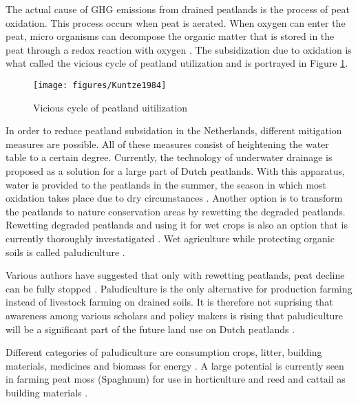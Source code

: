 \documentclass[a4paper,12pt]{scrbook}
\begin{document}
The actual cause of \ac{GHG} emissions from drained peatlands is the process of peat oxidation. This process occurs when peat is aerated. When oxygen can enter the peat, micro organisms can decompose the organic matter that is stored in the peat through a redox reaction with oxygen \citep{erkens2016double}. The subsidization due to oxidation is what \citet{kuntze1984bewirtschaftung} called the vicious cycle of peatland utilization and is portrayed in Figure \ref{fig:peatlanduti}.

\begin{figure}
    \centering
    \texttt{[image: figures/Kuntze1984]} 
    \caption{Vicious cycle of peatland uitilization}
    \label{fig:peatlanduti}
\end{figure}

In order to reduce peatland subsidation in the Netherlands, different mitigation measures are possible. All of these measures consist of heightening the water table to a certain degree. Currently, the technology of underwater drainage is proposed as a solution for a large part of Dutch peatlands. With this apparatus, water is provided to the peatlands in the summer, the season in which most oxidation takes place due to dry circumstances \citep{van2011huidige}. Another option is to transform the peatlands to nature conservation areas by rewetting the degraded peatlands. Rewetting degraded peatlands and using it for wet crops is also an option that is currently thoroughly investatigated \citep{Wichmann20151063}. Wet agriculture while protecting organic soils is called paludiculture \citep{joosten2002wise}. 

Various authors have suggested that only with rewetting peatlands, peat decline can be fully stopped \citep{van2016dalende, wichtmann2016paludiculture}. Paludiculture is the only alternative for production farming instead of livestock farming on drained soils. It is therefore not suprising that awareness among various scholars and policy makers is rising that paludiculture will be a significant part of the future land use on Dutch peatlands \citep{abel2013database, wichtmann2016paludiculture, Wichmann20151063}. 

Different categories of paludiculture are consumption crops, litter, building materials, medicines and biomass for energy \citep{wichtmann2016paludiculture}. A large potential is currently seen in farming peat moss (Spaghnum) for use in horticulture and reed and cattail as building materials \citep{wichtmann2016paludiculture}.
\end{document}
